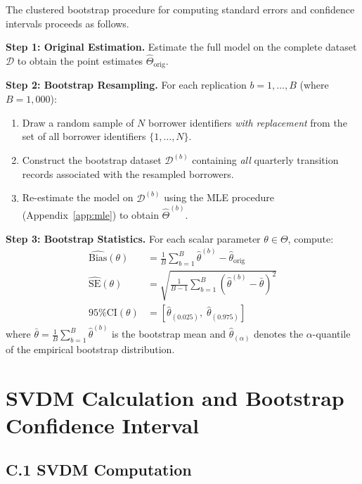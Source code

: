 \documentclass[12pt,a4paper]{article}
\begin{document}
The clustered bootstrap procedure for computing standard errors and confidence intervals proceeds as follows.

\textbf{Step 1: Original Estimation.} Estimate the full model on the complete dataset $\mathcal{D}$ to obtain the point estimates $\hat{\Theta}_{\text{orig}}$.

\textbf{Step 2: Bootstrap Resampling.} For each replication $b = 1, \ldots, B$ (where $B = 1{,}000$):
\begin{enumerate}[noitemsep]
    \item Draw a random sample of $N$ borrower identifiers \textit{with replacement} from the set of all borrower identifiers $\{1, \ldots, N\}$.
    \item Construct the bootstrap dataset $\mathcal{D}^{(b)}$ containing \textit{all} quarterly transition records associated with the resampled borrowers.
    \item Re-estimate the model on $\mathcal{D}^{(b)}$ using the MLE procedure (Appendix~\ref{app:mle}) to obtain $\hat{\Theta}^{(b)}$.
\end{enumerate}

\textbf{Step 3: Bootstrap Statistics.} For each scalar parameter $\theta \in \Theta$, compute:
\begin{align}
\widehat{\text{Bias}}(\theta) &= \frac{1}{B} \sum_{b=1}^{B} \hat{\theta}^{(b)} - \hat{\theta}_{\text{orig}} \\
\widehat{\text{SE}}(\theta) &= \sqrt{\frac{1}{B-1} \sum_{b=1}^{B} \left(\hat{\theta}^{(b)} - \bar{\theta}\right)^2} \\
\text{95\% CI}(\theta) &= \left[\hat{\theta}_{(0.025)},\; \hat{\theta}_{(0.975)}\right]
\end{align}
where $\bar{\theta} = \frac{1}{B}\sum_{b=1}^{B} \hat{\theta}^{(b)}$ is the bootstrap mean and $\hat{\theta}_{(\alpha)}$ denotes the $\alpha$-quantile of the empirical bootstrap distribution.

\section{SVDM Calculation and Bootstrap Confidence Interval}
\label{app:svdm}

\subsection*{C.1 SVDM Computation}
\end{document}
